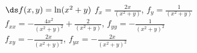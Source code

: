 {$\ds f(x,y) =\ln(x^2+y)$
}
{$f_x=\frac{2x}{(x^2+y)}$, $f_y=\frac{1}{(x^2+y)}$\\
$f_{xx}=-\frac{4x^2}{(x^2+y)^2}+\frac{2}{(x^2+y)}$, $f_{yy}=-\frac{1}{(x^2+y)^2}$\\
$f_{xy}=-\frac{2x}{(x^2+y)^2}$, $f_{yx}=-\frac{2x}{(x^2+y)^2}$\\
}